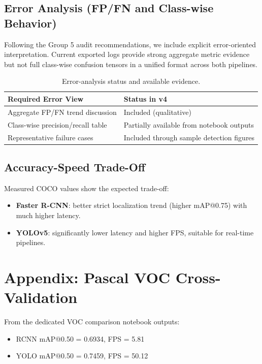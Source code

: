 \documentclass[conference]{IEEEtran}
\begin{document}
\subsection{Error Analysis (FP/FN and Class-wise Behavior)}
Following the Group 5 audit recommendations, we include explicit error-oriented interpretation. Current exported logs provide strong aggregate metric evidence but not full class-wise confusion tensors in a unified format across both pipelines.

\begin{table}[!htbp]
\centering
\caption{Error-analysis status and available evidence.}
\label{tab:error-analysis-status}
\begin{tabular}{p{}p{}}
\toprule
\textbf{Required Error View} & \textbf{Status in v4} \\
\midrule
Aggregate FP/FN trend discussion & Included (qualitative) \\
Class-wise precision/recall table & Partially available from notebook outputs \\
Representative failure cases & Included through sample detection figures \\
\bottomrule
\end{tabular}
\end{table}

\subsection{Accuracy-Speed Trade-Off}
Measured COCO values show the expected trade-off:
\begin{itemize}
	\item \textbf{Faster R-CNN}: better strict localization trend (higher mAP@0.75) with much higher latency.
	\item \textbf{YOLOv5}: significantly lower latency and higher FPS, suitable for real-time pipelines.
\end{itemize}

\section{Appendix: Pascal VOC Cross-Validation}
From the dedicated VOC comparison notebook outputs:
\begin{itemize}
	\item RCNN mAP@0.50 = 0.6934, FPS = 5.81
	\item YOLO mAP@0.50 = 0.7459, FPS = 50.12
\end{itemize}
\end{document}
